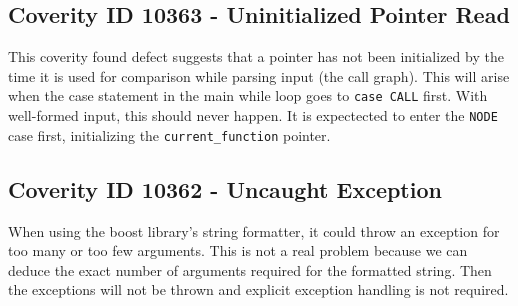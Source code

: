 \documentclass[12pt]{article}
\begin{document}
\subsection*{Coverity ID 10363 - Uninitialized Pointer Read}
This coverity found defect suggests that a pointer has not been initialized by the time it is used for comparison while parsing input (the call graph). This will arise when the case statement in the main while loop goes to \texttt{case CALL} first. With well-formed input, this should never happen. It is expectected to enter the \texttt{NODE} case first, initializing the \texttt{current\_function} pointer.

\subsection*{Coverity ID 10362 - Uncaught Exception}
When using the boost library's string formatter, it could throw an exception for too many or too few arguments. This is not a real problem because we can deduce the exact number of arguments required for the formatted string. Then the exceptions will not be thrown and explicit exception handling is not required.
\end{document}
